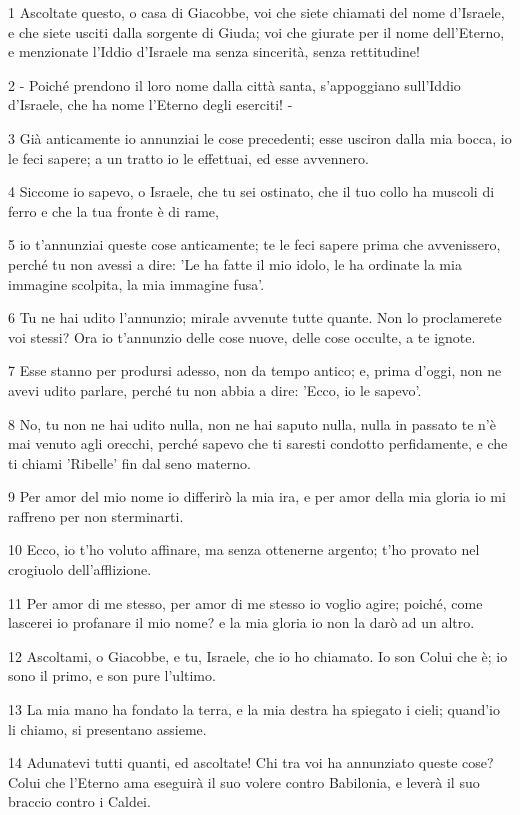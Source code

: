 \par 1 Ascoltate questo, o casa di Giacobbe, voi che siete chiamati del nome d'Israele, e che siete usciti dalla sorgente di Giuda; voi che giurate per il nome dell'Eterno, e menzionate l'Iddio d'Israele ma senza sincerità, senza rettitudine!
\par 2 - Poiché prendono il loro nome dalla città santa, s'appoggiano sull'Iddio d'Israele, che ha nome l'Eterno degli eserciti! -
\par 3 Già anticamente io annunziai le cose precedenti; esse usciron dalla mia bocca, io le feci sapere; a un tratto io le effettuai, ed esse avvennero.
\par 4 Siccome io sapevo, o Israele, che tu sei ostinato, che il tuo collo ha muscoli di ferro e che la tua fronte è di rame,
\par 5 io t'annunziai queste cose anticamente; te le feci sapere prima che avvenissero, perché tu non avessi a dire: 'Le ha fatte il mio idolo, le ha ordinate la mia immagine scolpita, la mia immagine fusa'.
\par 6 Tu ne hai udito l'annunzio; mirale avvenute tutte quante. Non lo proclamerete voi stessi? Ora io t'annunzio delle cose nuove, delle cose occulte, a te ignote.
\par 7 Esse stanno per prodursi adesso, non da tempo antico; e, prima d'oggi, non ne avevi udito parlare, perché tu non abbia a dire: 'Ecco, io le sapevo'.
\par 8 No, tu non ne hai udito nulla, non ne hai saputo nulla, nulla in passato te n'è mai venuto agli orecchi, perché sapevo che ti saresti condotto perfidamente, e che ti chiami 'Ribelle' fin dal seno materno.
\par 9 Per amor del mio nome io differirò la mia ira, e per amor della mia gloria io mi raffreno per non sterminarti.
\par 10 Ecco, io t'ho voluto affinare, ma senza ottenerne argento; t'ho provato nel crogiuolo dell'afflizione.
\par 11 Per amor di me stesso, per amor di me stesso io voglio agire; poiché, come lascerei io profanare il mio nome? e la mia gloria io non la darò ad un altro.
\par 12 Ascoltami, o Giacobbe, e tu, Israele, che io ho chiamato. Io son Colui che è; io sono il primo, e son pure l'ultimo.
\par 13 La mia mano ha fondato la terra, e la mia destra ha spiegato i cieli; quand'io li chiamo, si presentano assieme.
\par 14 Adunatevi tutti quanti, ed ascoltate! Chi tra voi ha annunziato queste cose? Colui che l'Eterno ama eseguirà il suo volere contro Babilonia, e leverà il suo braccio contro i Caldei.
